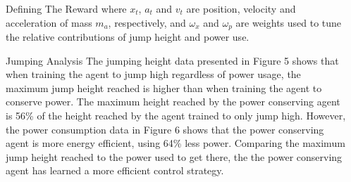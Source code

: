 \documentclass[final]{beamer}
\newlength{\onecolwid}
\newlength{\twocolwid}
\begin{document}
\begin{frame}[t]
\begin{columns}[t]
\begin{column}{\twocolwid}
\begin{columns}[t,totalwidth=\twocolwid]
\begin{column}{\onecolwid}
\begin{block}{Defining The Reward}
    where $x_t$, $a_t$ and $v_t$ are position, velocity and acceleration of mass $m_a$, respectively, and $\omega_{x}$ and $\omega_{p}$ are weights used to tune the relative contributions of jump height and power use. 
\end{block}

\begin{block}{Jumping Analysis}
The jumping height data presented in Figure 5 shows that when training the agent to jump high regardless of power usage, the maximum jump height reached is higher than when training the agent to conserve power. The maximum height reached by the power conserving agent is 56\% of the height reached by the agent trained to only jump high. However, the power consumption data in Figure 6 shows that the power conserving agent is more energy efficient, using 64\% less power. Comparing the maximum jump height reached to the power used to get there, the the power conserving agent has learned a more efficient control strategy.
\end{block}


\end{column} %


\begin{column}{\onecolwid}\vspace{-.57in} %



\end{column}
\end{columns}
\end{column}
\end{columns}
\end{frame}
\end{document}
